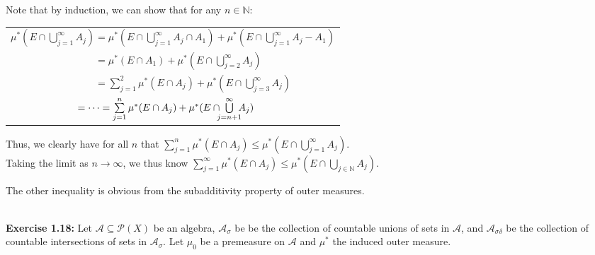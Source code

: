 \documentclass{book}
\newcommand{\exTwoP}{%
   \color{RedViolet}%
   \fontsize{13}{15}\selectfont%
}
\newcommand{\exPP}{%
   \color{RedViolet}%
   \fontsize{12}{14}\selectfont%
}
\newenvironment{myIndent}{%
   \begin{adjustwidth}{2.5em}{0em}%
}{%
   \end{adjustwidth}%
}
\newcommand{\blab}[1]{\textbf{#1}}
\newcommand{\mySepTwo}[1][.]{%
   {\noindent\color{#1}{\rule{6.5in}{0.5mm}}}\\%
}
\newcommand{\retTwo}{\hfill\bigbreak}
\begin{document}
\begin{myIndent}\exTwoP
   Note that by induction, we can show that for any $n \in \mathbb{N}$:

   {\centering\exPP
   \begin{tabular}{l}
      $\mu^*(E \cap \bigcup\limits_{j=1}^\infty A_j) = \mu^*(E \cap \bigcup\limits_{j=1}^\infty A_j \cap A_1) + \mu^*(E \cap \bigcup\limits_{j=1}^\infty A_j - A_1)$\\ [4pt]
      $\phantom{\mu^*(E \cap \bigcup\limits_{j=1}^\infty A_j)} = \mu^*(E \cap A_1) + \mu^*(E \cap \bigcup\limits_{j=2}^\infty A_j)$\\ [4pt]
      $\phantom{\mu^*(E \cap \bigcup\limits_{j=1}^\infty A_j)} = \sum\limits_{j=1}^2\mu^*(E \cap A_j) + \mu^*(E \cap \bigcup\limits_{j=3}^\infty A_j)$\\ [4pt]
      $\phantom{\mu^*(E \cap \bigcup\limits_{j=1}^\infty A_j)} = \cdots = \sum\limits_{j=1}^n \mu^*(E \cap A_j) + \mu^*(E \cap \hspace{-0.5em}\bigcup\limits_{j=n+1}^\infty\hspace{-0.5em} A_j)$
   \end{tabular} \retTwo\par}

   Thus, we clearly have for all $n$ that $\sum\limits_{j=1}^n \mu^*(E \cap A_j) \leq \mu^*(E \cap \bigcup\limits_{j=1}^\infty A_j)$.\\ [-6pt]

   Taking the limit as $n \rightarrow \infty$, we thus know $\sum\limits_{j=1}^\infty \mu^*(E \cap A_j) \leq \mu^*(E \cap \bigcup\limits_{j \in \mathbb{N}}A_j)$.\retTwo

   The other inequality is obvious from the subadditivity property of outer measures.\retTwo
\end{myIndent}

\mySepTwo

\blab{Exercise 1.18:} Let $\mathcal{A} \subseteq \mathcal{P}(X)$ be an algebra, $\mathcal{A}_\sigma$ be be the collection of countable unions of sets in $\mathcal{A}$, and $\mathcal{A}_{\sigma\delta}$ be the collection of countable intersections of sets in $\mathcal{A}_{\sigma}$. Let $\mu_0$ be a premeasure on $\mathcal{A}$ and $\mu^*$ the induced outer measure.\newpage
\end{document}
